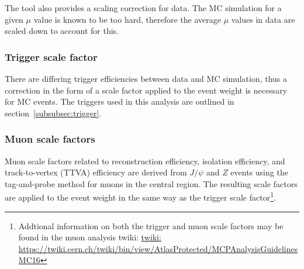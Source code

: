The tool also provides a scaling correction for data. The MC simulation for a given $\mu$ value is known to be too hard, therefore the average $\mu$ values in data are scaled down to account for this.

\subsubsection{Trigger scale factor}
There are differing trigger efficiencies between data and MC simulation, thus a correction in the form of a scale factor applied to the event weight is necessary for MC events. The triggers used in this analysis are outlined in section~\ref{subsubsec:trigger}.

\subsubsection{Muon scale factors}
Muon scale factors related to reconstruction efficiency, isolation efficiency, and track-to-vertex (TTVA) efficiency are derived from $J/\psi$ and $Z$ events using the tag-and-probe method for muons in the central region. The resulting scale factors are applied to the event weight in the same way as the trigger scale
factor\footnote{Addtional information on both the trigger and muon scale factors may be found in the muon analysis twiki: \url{twiki: https://twiki.cern.ch/twiki/bin/view/AtlasProtected/MCPAnalysisGuidelinesMC16}}.

